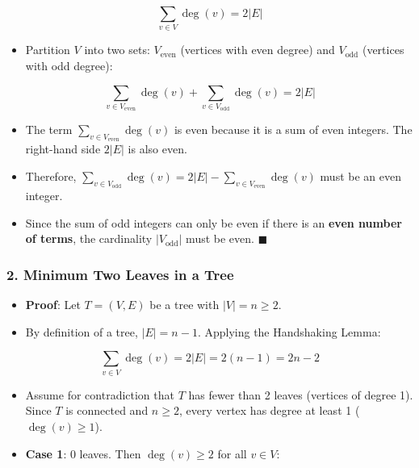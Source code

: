 \documentclass[
]{book}
\providecommand{\tightlist}{%
  \setlength{\itemsep}{0pt}\setlength{\parskip}{0pt}}
\theoremstyle{definition}
\theoremstyle{definition}
\theoremstyle{definition}
\theoremstyle{definition}
\theoremstyle{remark}
\begin{document}
\[\sum_{v \in V} \deg(v) = 2\vert{}E\vert{}\]

\begin{itemize}
\tightlist
\item
  Partition \(V\) into two sets: \(V_{\text{even}}\) (vertices with even degree) and \(V_{\text{odd}}\) (vertices with odd degree):
\end{itemize}

\[\sum_{v \in V_{\text{even}}} \deg(v) + \sum_{v \in V_{\text{odd}}} \deg(v) = 2\vert{}E\vert{}\]

\begin{itemize}
\tightlist
\item
  The term \(\sum_{v \in V_{\text{even}}} \deg(v)\) is even because it is a sum of even integers. The right-hand side \(2\vert{}E\vert{}\) is also even.
\item
  Therefore, \(\sum_{v \in V_{\text{odd}}} \deg(v) = 2\vert{}E\vert{} - \sum_{v \in V_{\text{even}}} \deg(v)\) must be an even integer.
\item
  Since the sum of odd integers can only be even if there is an \textbf{even number of terms}, the cardinality \(\vert{}V_{\text{odd}}\vert{}\) must be even. \(\blacksquare\)
\end{itemize}

\subsubsection{2. Minimum Two Leaves in a Tree}\label{minimum-two-leaves-in-a-tree}

\begin{itemize}
\tightlist
\item
  \textbf{Proof}: Let \(T = (V, E)\) be a tree with \(\vert{}V\vert{} = n \ge 2\).
\item
  By definition of a tree, \(\vert{}E\vert{} = n - 1\). Applying the Handshaking Lemma:
\end{itemize}

\[\sum_{v \in V} \deg(v) = 2\vert{}E\vert{} = 2(n - 1) = 2n - 2\]

\begin{itemize}
\tightlist
\item
  Assume for contradiction that \(T\) has fewer than 2 leaves (vertices of degree 1). Since \(T\) is connected and \(n \ge 2\), every vertex has degree at least 1 (\(\deg(v) \ge 1\)).
\item
  \textbf{Case 1}: 0 leaves. Then \(\deg(v) \ge 2\) for all \(v \in V\):
\end{itemize}
\end{document}
